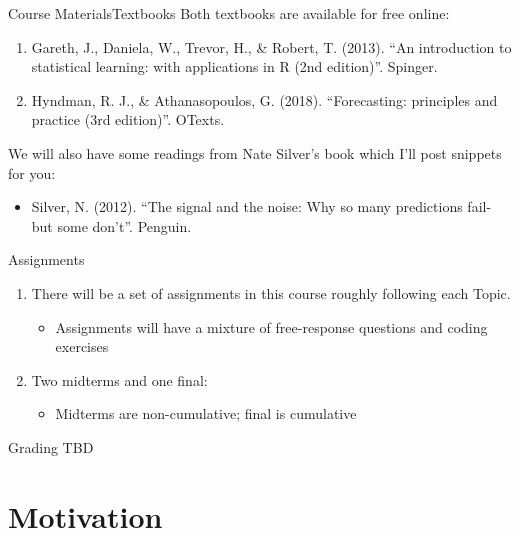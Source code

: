\documentclass[aspectratio=169,t,11pt,table]{beamer}
\begin{document}
\begin{frame}{Course Materials}{Textbooks}
  Both textbooks are available for free online:
  \begin{enumerate}
    \item Gareth, J., Daniela, W., Trevor, H., \& Robert, T. (2013). ``An introduction to statistical learning: with applications in R (2nd edition)''. Spinger.
    
    \item Hyndman, R. J., \& Athanasopoulos, G. (2018). ``Forecasting: principles and practice (3rd edition)''. OTexts.
  \end{enumerate}

  \bigskip
  We will also have some readings from Nate Silver's book which I'll post snippets for you:
  \begin{itemize}
    \item Silver, N. (2012). ``The signal and the noise: Why so many predictions fail-but some don't''. Penguin.
  \end{itemize}
\end{frame}

\begin{frame}{Assignments}
  \begin{enumerate}
    \item There will be a set of assignments in this course roughly following each Topic.
    \begin{itemize}
      \item Assignments will have a mixture of free-response questions and coding exercises
    \end{itemize}

    \item Two midterms and one final:
    \begin{itemize}
      \item Midterms are non-cumulative; final is cumulative
    \end{itemize}
  \end{enumerate}
\end{frame}

\begin{frame}{Grading}
  TBD
\end{frame}





\section{Motivation}
\end{document}
